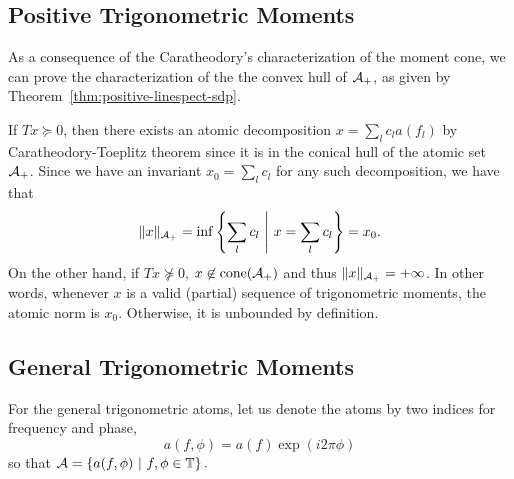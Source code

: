 \subsection{Positive Trigonometric Moments} %
\label{sub:positive_trigonometric_moments}

As a consequence of the Caratheodory's characterization of the moment cone, we
can prove the characterization of the the convex hull of $\mathcal{A}_+$, as given by
Theorem~\ref{thm:positive-linespect-sdp}.

If $T x \succeq 0$, then there exists an atomic decomposition $x = \sum_l c_l
a(f_l)$ by Caratheodory-Toeplitz theorem since it is in the conical hull of the
atomic set $\mathcal{A}_+$. Since we have an invariant $x_0 = \sum_l c_l$ for any such
decomposition, we have that
\[
\lVert x\rVert_{\mathcal{A}_{+}}  = \inf\left\{ \sum_l{c_l} ~\middle|~ x = \sum_l c_l \right\} = x_0.
\]
On the other hand, if $Tx \not\succeq 0$, $x \not\in \operatorname{cone}(\mathcal{A}_+)$ and thus
$\lVert x\rVert_{\mathcal{A}_{+}} = +\infty$. In other words, whenever $x$ is a valid
(partial) sequence of trigonometric moments, the atomic norm is $x_0$.
Otherwise, it is unbounded by definition.


\subsection{General Trigonometric Moments} %
\label{sub:general_trigonometric_moments}

For the general trigonometric atoms, let us denote the atoms by two indices for  frequency and phase,
\[
	a(f,\phi) = a(f) \exp(i 2\pi \phi)
\]
so that $\mathcal{A} = \left\{ a(f,\phi) ~\middle|~ f, \phi \in \mathbb{T} \right\}.$

